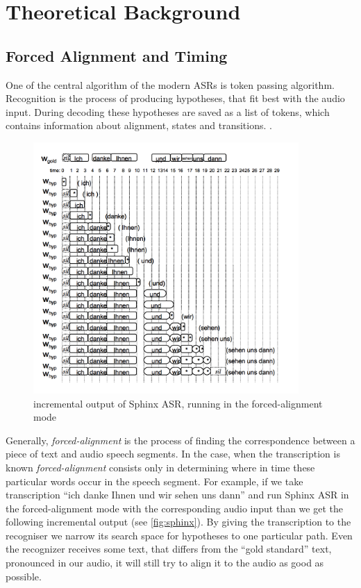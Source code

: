 \chapter{Theoretical Background}
\label{chap:terms}
 \section {Forced Alignment and Timing} 
One of the central algorithm  of the modern ASRs is token passing
algorithm. Recognition is the process of producing hypotheses, that fit best
with the audio input. During decoding these hypotheses are
saved as a list of tokens, which contains information about alignment, states
and transitions. \parencite {Young89Token}.

\begin{figure}[htbp]
  \centering
   \includegraphics[width=0.9\textwidth]{images/sphinxfa_output.png}
  \caption{incremental output of Sphinx ASR, running in the forced-alignment
  mode}
  \label{fig:sphinxfa}
\end{figure}

Generally, \textit {forced-alignment} is the process of finding the
correspondence between a piece of text and audio speech segments. In the case,
when the transcription is known \textit {forced-alignment} consists only in
determining where in time these particular words occur in the speech segment. 
For example, if we take transcription ``ich danke Ihnen und wir sehen uns dann''
and run Sphinx ASR in the forced-alignment mode with the corresponding audio input than we 
get the following incremental output (see \ref {fig:sphinx}).
By giving the transcription to the recogniser we narrow its search space for hypotheses to
one particular path. Even the recognizer receives some text, that differs from
the ``gold standard'' text, pronounced in our audio, it will still try to align it
to the audio as good as possible. 

